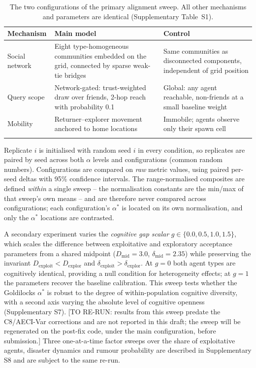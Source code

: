 \documentclass[pdflatex,sn-basic]{sn-jnl}
\begin{document}
\begin{table}[h]
\caption{The two configurations of the primary alignment sweep. All other mechanisms and parameters are identical (Supplementary Table~S1).}\label{tab:configs}
\begin{tabular}{@{}p{3.2cm}p{4.6cm}p{4.6cm}@{}}
\toprule
Mechanism & Main model & Control \\
\midrule
Social network & Eight type-homogeneous communities embedded on the grid, connected by sparse weak-tie bridges & Same communities as disconnected components, independent of grid position \\
Query scope & Network-gated: trust-weighted draw over friends, 2-hop reach with probability 0.1 & Global: any agent reachable, non-friends at a small baseline weight \\
Mobility & Returner--explorer movement anchored to home locations \citep{pappalardo2015returners} & Immobile; agents observe only their spawn cell \\
\botrule
\end{tabular}
\end{table} Replicate $i$ is initialised with random seed $i$ in every condition, so replicates are paired by seed across both $\alpha$ levels and configurations (common random numbers). Configurations are compared on \emph{raw} metric values, using paired per-seed deltas with 95\% confidence intervals. The range-normalised composites are defined \emph{within} a single sweep -- the normalisation constants are the min/max of that sweep's own means -- and are therefore never compared across configurations; each configuration's $\alpha^{*}$ is located on its own normalisation, and only the $\alpha^{*}$ locations are contrasted.

A secondary experiment varies the \emph{cognitive gap scalar} $g \in \{0.0, 0.5, 1.0, 1.5\}$, which scales the difference between exploitative and exploratory acceptance parameters from a shared midpoint ($D_{\text{mid}} = 3.0$, $\delta_{\text{mid}} = 2.35$) while preserving the invariant $D_{\text{exploit}} < D_{\text{explor}}$ and $\delta_{\text{exploit}} > \delta_{\text{explor}}$. At $g = 0$ both agent types are cognitively identical, providing a null condition for heterogeneity effects; at $g = 1$ the parameters recover the baseline calibration. This sweep tests whether the Goldilocks $\alpha^{*}$ is robust to the degree of within-population cognitive diversity, with a second axis varying the absolute level of cognitive openness (Supplementary S7). [TO RE-RUN: results from this sweep predate the C8/AECI-Var corrections and are not reported in this draft; the sweep will be regenerated on the post-fix code, under the main configuration, before submission.] Three one-at-a-time factor sweeps over the share of exploitative agents, disaster dynamics and rumour probability are described in Supplementary S8 and are subject to the same re-run.
\end{document}
